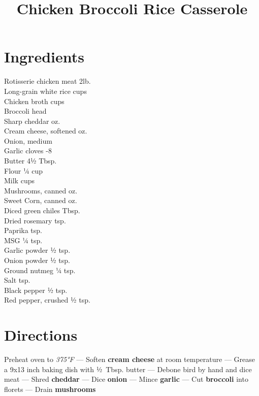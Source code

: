 \documentclass[11pt,letterpaper]{article}
\title{Chicken Broccoli Rice Casserole}
\author{}
\date{}
\begin{document}
\maketitle
\thispagestyle{empty}

\section*{Ingredients}
\setlength{\columnsep}{20pt}
\begin{multicols}{2}
\noindent
    Rotisserie chicken meat \dotfill 2lb. \\
    Long-grain white rice  cups \\
    Chicken broth  cups \\
    Broccoli  head \\
    Sharp cheddar  oz. \\
    Cream cheese, softened  oz. \\
    Onion, medium  \\
    Garlic cloves -8 \\
    Butter \dotfill 4½ Tbsp. \\
    Flour \dotfill ¼ cup \\
    Milk  cups \\
    \columnbreak
    Mushrooms, canned  oz. \\
    Sweet Corn, canned  oz. \\
    Diced green chiles  Tbsp. \\
    Dried rosemary  tsp. \\
    Paprika  tsp. \\
    MSG \dotfill ¼ tsp. \\
    Garlic powder \dotfill ½ tsp. \\
    Onion powder \dotfill ½ tsp. \\
    Ground nutmeg \dotfill ¼ tsp. \\
    Salt  tsp. \\
    Black pepper \dotfill ½ tsp. \\
    Red pepper, crushed \dotfill ½ tsp.
\end{multicols}

\section*{Directions}

\noindent
Preheat oven to \textit{375°F} ---
Soften \textbf{cream cheese} at room temperature ---
Grease a 9x13 inch baking dish with ½~Tbsp. butter ---
Debone bird by hand and dice meat ---
Shred \textbf{cheddar} ---
Dice \textbf{onion} ---
Mince \textbf{garlic} ---
Cut \textbf{broccoli} into florets ---
Drain \textbf{mushrooms}
\end{document}
